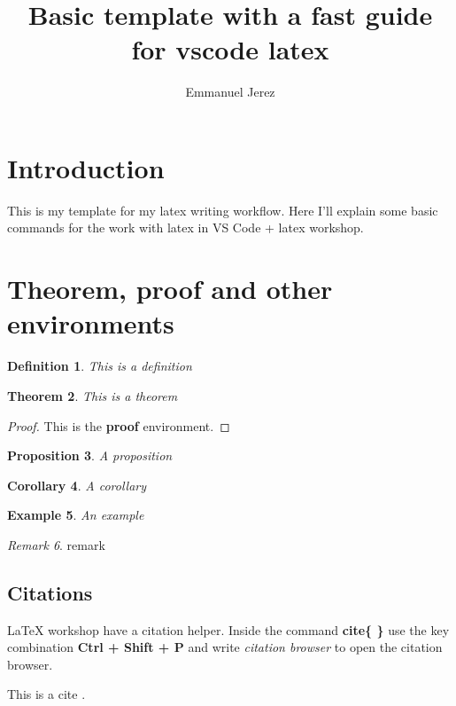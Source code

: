 \documentclass[12pt,final]{article}
\title{Basic template with a fast guide for vscode latex}
\author{Emmanuel Jerez}
\numberwithin{equation}{section}
\newtheorem{theorem}{Theorem}
\newtheorem{definition}[theorem]{Definition}
\newtheorem{example}[theorem]{Example}
\newtheorem{corollary}[theorem]{Corollary}
\newtheorem{proposition}[theorem]{Proposition}
\theoremstyle{remark}
\newtheorem{remark}[theorem]{Remark}
\begin{document}
 \maketitle

 \section{Introduction}

This is my template for my latex writing workflow. Here I'll explain some basic commands for the work with latex in VS Code + latex workshop.

 \section{Theorem, proof and other environments}

 \begin{definition}
  This is a definition
 \end{definition}

 \begin{theorem}
   This is a theorem
 \end{theorem}

 \begin{proof}
  This is the \textbf{proof} environment.
 \end{proof}

 \begin{proposition}
  A proposition
 \end{proposition}

 \begin{corollary}
  A corollary
 \end{corollary}

 \begin{example}
  An example
 \end{example}
 
\begin{remark}
  remark
\end{remark}

\subsection*{Citations}

LaTeX workshop have a citation helper. Inside the command \textbf{cite\{ \}} use the key combination \textbf{Ctrl + Shift + P} and write \textit{citation browser} to open the citation browser. 

This is a cite \cite[Theorem 1]{SOLOMON1967603}.
\end{document}
